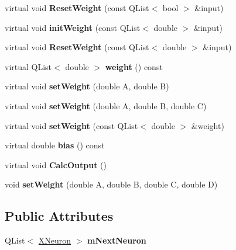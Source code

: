 \begin{DoxyCompactItemize}
virtual void {\bfseries Reset\+Weight} (const Q\+List$<$ bool $>$ \&input)
\item 
\hypertarget{class_x_neuron_a49794575e12094f4f336909a788b5d03}{}\label{class_x_neuron_a49794575e12094f4f336909a788b5d03} 
virtual void {\bfseries init\+Weight} (const Q\+List$<$ double $>$ \&input)
\item 
\hypertarget{class_x_neuron_a05efde6b330a87218eb9560b93837142}{}\label{class_x_neuron_a05efde6b330a87218eb9560b93837142} 
virtual void {\bfseries Reset\+Weight} (const Q\+List$<$ double $>$ \&input)
\item 
\hypertarget{class_x_neuron_a963745b2b34d5bcfe21be3a81a0b7c18}{}\label{class_x_neuron_a963745b2b34d5bcfe21be3a81a0b7c18} 
virtual Q\+List$<$ double $>$ {\bfseries weight} () const
\item 
\hypertarget{class_x_neuron_a46b611c44bfd8c9ca391a8c55698ca5e}{}\label{class_x_neuron_a46b611c44bfd8c9ca391a8c55698ca5e} 
virtual void {\bfseries set\+Weight} (double A, double B)
\item 
\hypertarget{class_x_neuron_ab91134205006e82b872d9724bc677106}{}\label{class_x_neuron_ab91134205006e82b872d9724bc677106} 
virtual void {\bfseries set\+Weight} (double A, double B, double C)
\item 
\hypertarget{class_x_neuron_a80505d7f586c511cbc79646788ab2f22}{}\label{class_x_neuron_a80505d7f586c511cbc79646788ab2f22} 
virtual void {\bfseries set\+Weight} (const Q\+List$<$ double $>$ \&weight)
\item 
\hypertarget{class_x_neuron_a07b4676157782cfed59364c91cf84aed}{}\label{class_x_neuron_a07b4676157782cfed59364c91cf84aed} 
virtual double {\bfseries bias} () const
\item 
\hypertarget{class_x_neuron_aeaf8310866462df8946df4b2c65e306a}{}\label{class_x_neuron_aeaf8310866462df8946df4b2c65e306a} 
virtual void {\bfseries Calc\+Output} ()
\item 
\hypertarget{class_x_neuron_a8b3849d0c889f676ec3f1863167aadec}{}\label{class_x_neuron_a8b3849d0c889f676ec3f1863167aadec} 
void {\bfseries set\+Weight} (double A, double B, double C, double D)
\end{DoxyCompactItemize}
\subsection*{Public Attributes}
\begin{DoxyCompactItemize}
\item 
\hypertarget{class_x_neuron_aba949156bcc9aa4a0d84c342bf8b5bf4}{}\label{class_x_neuron_aba949156bcc9aa4a0d84c342bf8b5bf4} 
Q\+List$<$ \hyperlink{class_x_neuron}{X\+Neuron} $>$ {\bfseries m\+Next\+Neuron}
\end{DoxyCompactItemize}
